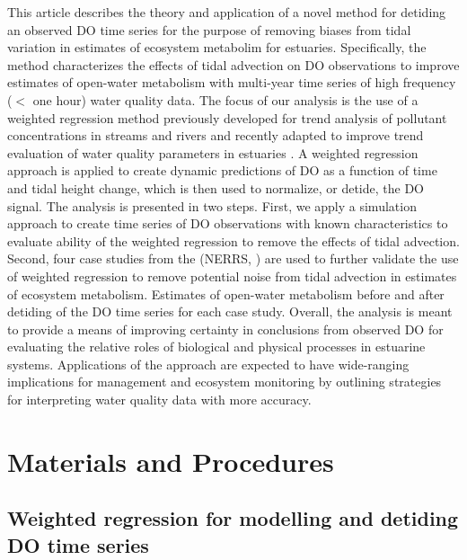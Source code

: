 \documentclass[letterpaper,12pt,oneside]{article}\usepackage[]{graphicx}\usepackage[]{color}
\begin{document}
This article describes the theory and application of a novel method for detiding an observed \ac{DO} time series for the purpose of removing biases from tidal variation in estimates of ecosystem metabolim for estuaries.  Specifically, the method characterizes the effects of tidal advection on \ac{DO} observations to improve estimates of open-water metabolism with multi-year time series of high frequency ($<$ one hour) water quality data.  The focus of our analysis is the use of a weighted regression method previously developed for trend analysis of pollutant concentrations in streams and rivers \citep{Hirsch10} and recently adapted to improve trend evaluation of water quality parameters in estuaries .  A weighted regression approach is applied to create dynamic predictions of \ac{DO} as a function of time and tidal height change, which is then used to normalize, or detide, the \ac{DO} signal.  The analysis is presented in two steps.  First, we apply a simulation approach to create time series of \ac{DO} observations with known characteristics to evaluate ability of the weighted regression to remove the effects of tidal advection.  Second, four case studies from the  (\acs{NERRS}, \citealt{Wenner04}) are used to further validate the use of weighted regression to remove potential noise from tidal advection in estimates of ecosystem metabolism.  Estimates of open-water metabolism before and after detiding of the \ac{DO} time series for each case study.  Overall, the analysis is meant to provide a means of improving certainty in conclusions from observed \ac{DO} for evaluating the relative roles of biological and physical processes in estuarine systems.  Applications of the approach are expected to have wide-ranging implications for management and ecosystem monitoring by outlining strategies for interpreting water quality data with more accuracy.

\section{Materials and Procedures}

\subsection{Weighted regression for modelling and detiding \ac{DO} time series}
\end{document}
